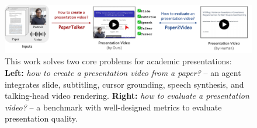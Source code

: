 
\begin{figure}[!t]  %
    \vspace{-1\baselineskip}
    \centering
    \small
    \captionsetup{skip=2pt}  
    \includegraphics[width=\linewidth]{figure/teaser.pdf}
    \caption{{This work solves two core problems for academic presentations:} \textbf{Left:} \textit{how to create a presentation video from a paper?} {\agent} -- an agent integrates slide, subtitling, cursor grounding, speech synthesis, and talking-head video rendering. \textbf{Right:} \textit{how to evaluate a presentation video?} {\bench} -- a benchmark with well-designed metrics to evaluate presentation quality.}
    \label{fig:teaser}
    \vspace{-0.5\baselineskip}
\end{figure}


